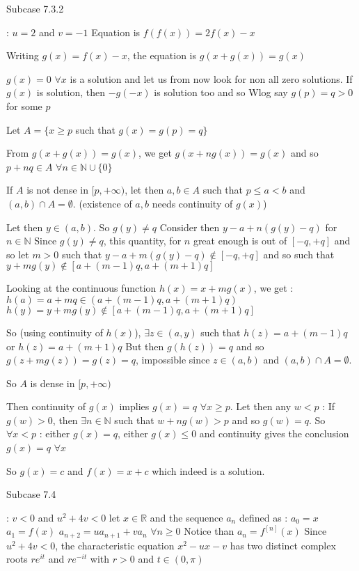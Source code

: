 \begin{solution}
\begin{tcolorbox}
\begin{bolded}Subcase 7.3.2\end{bolded} : $u=2$ and $v=-1$
Equation is $f(f(x))=2f(x)-x$

Writing $g(x)=f(x)-x$, the equation is $g(x+g(x))=g(x)$

$g(x)=0$ $\forall x$ is a solution and let us from now look for non all zero solutions.
If $g(x)$ is solution, then $-g(-x)$ is solution too and so Wlog say $g(p)=q>0$ for some $p$

Let $A=\{x\ge p$ such that $g(x)=g(p)=q\}$

From $g(x+g(x))=g(x)$, we get $g(x+ng(x))=g(x)$ and so $p+nq\in A$ $\forall n\in\mathbb N\cup\{0\}$

If $A$ is not dense in $[p,+\infty)$, let then $a,b\in A$ such that $p\le a<b$ and $(a,b)\cap A=\emptyset$. (existence of $a,b$ needs continuity of $g(x)$)

Let then $y\in(a,b)$. So $g(y)\ne q$ 
Consider then $y-a+n(g(y)-q)$ for $n\in\mathbb N$
Since $g(y)\ne q$, this quantity, for $n$ great enough is out of $[-q,+q]$ and so let $m>0$ such that $y-a+m(g(y)-q)\notin[-q,+q]$ and so such that $y+mg(y)\notin[a+(m-1)q,a+(m+1)q]$

Looking at the continuous function $h(x)=x+mg(x)$, we get :
$h(a)=a+mq\in(a+(m-1)q,a+(m+1)q)$
$h(y)=y+mg(y)\notin[a+(m-1)q,a+(m+1)q]$

So (using continuity of $h(x)$), $\exists z\in(a,y)$ such that $h(z)=a+(m-1)q$ or $h(z)=a+(m+1)q$
But then $g(h(z))=q$ and so $g(z+mg(z))=g(z)=q$, impossible since $z\in(a,b)$ and $(a,b)\cap A=\emptyset$.

So $A$ is dense in $[p,+\infty)$

Then continuity of $g(x)$ implies $g(x)=q$ $\forall x\ge p$.
Let then any $w<p$ : If $g(w)>0$, then $\exists n\in\mathbb N$ such that $w+ng(w)>p$ and so $g(w)=q$. So $\forall x<p$ : either $g(x)=q$, either $g(x)\le 0$ and continuity gives the conclusion $g(x)=q$ $\forall x$

So $g(x)=c$ and $f(x)=x+c$ which indeed is a solution.

\begin{bolded}Subcase 7.4 \end{bolded}: $v<0$ and $u^2+4v<0$
let $x\in\mathbb R$ and the sequence $a_n$ defined as :
$a_0=x$
$a_1=f(x)$
$a_{n+2}=ua_{n+1}+va_n$ $\forall n\ge 0$
Notice than $a_n=f^{[n]}(x)$
Since $u^2+4v<0$, the characteristic equation $x^2-ux-v$ has two distinct complex roots $re^{it}$ and $re^{-it}$ with $r>0$ and $t\in(0,\pi)$


\end{tcolorbox}
\end{solution}
